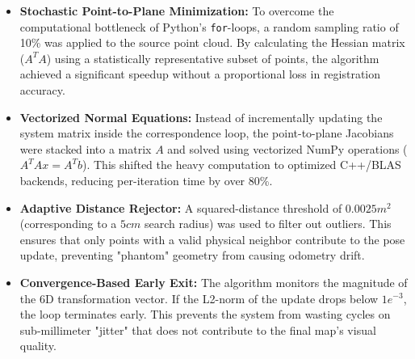 \documentclass{article}
\begin{document}
\begin{itemize}
    \item \textbf{Stochastic Point-to-Plane Minimization:} To overcome the computational bottleneck of Python's \texttt{for}-loops, a random sampling ratio of 10\% was applied to the source point cloud. By calculating the Hessian matrix ($A^T A$) using a statistically representative subset of points, the algorithm achieved a significant speedup without a proportional loss in registration accuracy.
    \item \textbf{Vectorized Normal Equations:} Instead of incrementally updating the system matrix inside the correspondence loop, the point-to-plane Jacobians were stacked into a matrix $A$ and solved using vectorized NumPy operations ($A^T A x = A^T b$). This shifted the heavy computation to optimized C++/BLAS backends, reducing per-iteration time by over 80\%.
    \item \textbf{Adaptive Distance Rejector:} A squared-distance threshold of $0.0025m^2$ (corresponding to a $5cm$ search radius) was used to filter out outliers. This ensures that only points with a valid physical neighbor contribute to the pose update, preventing "phantom" geometry from causing odometry drift.
    \item \textbf{Convergence-Based Early Exit:} The algorithm monitors the magnitude of the 6D transformation vector. If the L2-norm of the update drops below $1e^{-3}$, the loop terminates early. This prevents the system from wasting cycles on sub-millimeter "jitter" that does not contribute to the final map's visual quality.
\end{itemize}
\end{document}
